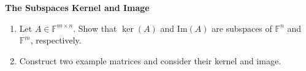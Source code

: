 \textbf{The Subspaces Kernel and Image}
\begin{enumerate}
	\item Let $A\in \mathbb{F}^{m \times n}$. Show that $\ker (A)$ and $\text{Im} (A)$ are subspaces of $\mathbb{F}^n$ and $\mathbb{F}^m$, respectively.
	\item Construct two example matrices and consider their kernel and image.
\end{enumerate}